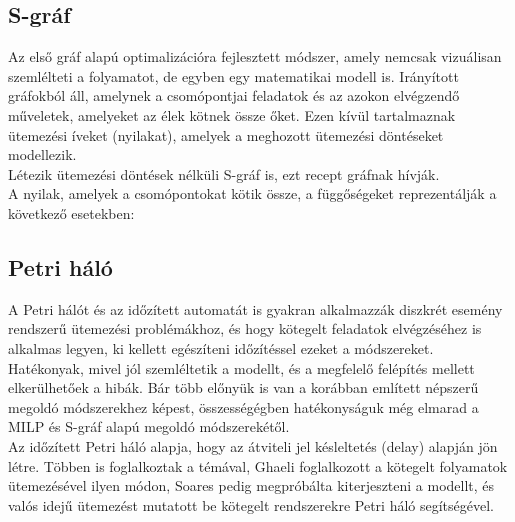 \documentclass {report}
\begin{document}
 \subsection{S-gráf}
   Az első gráf alapú optimalizációra fejlesztett módszer, amely nemcsak vizuálisan szemlélteti a folyamatot, de egyben egy matematikai modell is. Irányított gráfokból áll, amelynek a csomópontjai feladatok és az azokon elvégzendő műveletek, amelyeket az élek kötnek össze őket. Ezen kívül tartalmaznak ütemezési íveket (nyilakat), amelyek a meghozott ütemezési döntéseket modellezik.\\
   Létezik ütemezési döntések nélküli S-gráf is, ezt recept gráfnak hívják. \\
   A nyilak,  amelyek a csomópontokat kötik össze, a függőségeket reprezentálják a következő esetekben:

\subsection{Petri háló}
A Petri hálót és az időzített automatát is gyakran alkalmazzák diszkrét esemény rendszerű ütemezési problémákhoz, és hogy kötegelt feladatok elvégzéséhez is alkalmas legyen, ki kellett egészíteni  időzítéssel ezeket a módszereket. Hatékonyak, mivel jól szemléltetik a modellt, és a megfelelő felépítés mellett elkerülhetőek a hibák. Bár több előnyük is van a korábban említett népszerű megoldó módszerekhez képest, összességégben hatékonyságuk még elmarad a MILP és S-gráf alapú megoldó módszerekétől. \\
Az időzített Petri háló alapja, hogy az átviteli jel késleltetés (delay) alapján jön létre. Többen is foglalkoztak a témával, Ghaeli foglalkozott a kötegelt folyamatok ütemezésével ilyen módon, Soares pedig megpróbálta kiterjeszteni a modellt, és valós idejű ütemezést mutatott be kötegelt rendszerekre Petri háló segítségével. 
\end{document}
